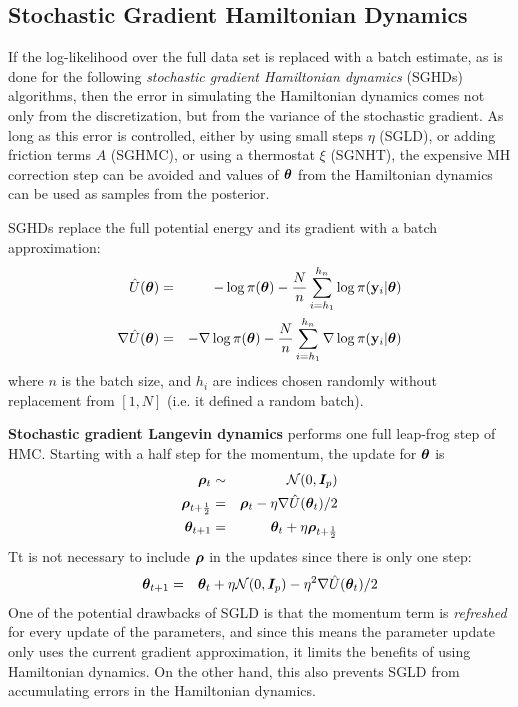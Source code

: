 \documentclass[]{article}
\begin{document}
\subsection{Stochastic Gradient Hamiltonian Dynamics}\label{se:sghd}
If the log-likelihood over the full data set is replaced with a batch estimate, as is done for the following {\em stochastic gradient Hamiltonian dynamics} (SGHDs) algorithms, then the error in simulating the Hamiltonian dynamics comes not only from the discretization, but from the variance of the stochastic gradient.  As long as this error is controlled, either by using small steps $\eta$ (SGLD), or adding friction terms $A$ (SGHMC), or using a thermostat $\xi$ (SGNHT), the expensive MH correction step can be avoided and values of ${\bm \theta}$ from the Hamiltonian dynamics can be used as samples from the posterior.

SGHDs replace the full potential energy and its gradient with a batch approximation:
\begin{eqnarray}
  \hat{U}({\bm \theta})       & = & - \log \pi({\bm \theta}) - \frac{N}{n} \sum_{i=h_1}^{h_n} \log \pi({\bf y}_i | {\bm \theta} ) \\
  \nabla\hat{U}({\bm \theta}) & = & - \nabla \log \pi({\bm \theta}) - \frac{N}{n} \sum_{i=h_1}^{h_n} \nabla \log \pi({\bf y}_i | {\bm \theta} ) 
\end{eqnarray} 
where $n$ is the batch size, and $h_i$ are indices chosen randomly without replacement from $[1,N]$ (i.e. it defined a random batch).  
 
{\bf Stochastic gradient Langevin dynamics} \cite{welling2011bayesian} performs one full leap-frog step of HMC.   Starting with a half step for the momentum, the update for ${\bm \theta}$ is 
\begin{eqnarray}
  {\bm \rho}_t & \sim & \mathcal{N}(0,{\bm I}_p) \\
  {\bm \rho}_{t+\frac{1}{2}} & = & {\bm \rho}_t - \eta \nabla \hat{U}({\bm \theta}_t) /2 \\
  {\bm \theta}_{t+1} & = & {\bm \theta}_t + \eta {\bm \rho}_{t+\frac{1}{2}}
\end{eqnarray}
Tt is not necessary to include ${\bm \rho}$ in the updates since there is only one step:
\begin{eqnarray}
  {\bm \theta}_{t+1} & = & {\bm \theta}_t + \eta \mathcal{N}(0,{\bm I}_p) - \eta^2 \nabla \hat{U}({\bm \theta}_t) /2 
\end{eqnarray}
One of the potential drawbacks of SGLD is that the momentum term is {\em refreshed} for every update of the parameters, and since this means the parameter update only uses the current gradient approximation, it limits the benefits of using Hamiltonian dynamics.  On the other hand, this also prevents SGLD from accumulating errors in the Hamiltonian dynamics.
\end{document}
